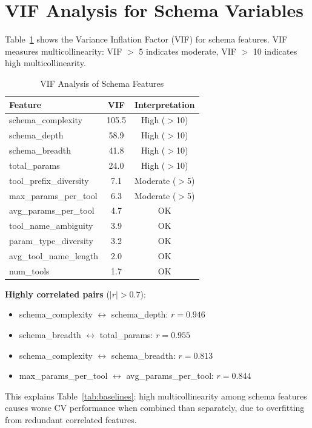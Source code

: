 \documentclass[sigconf,anonymous,review]{acmart}
\begin{document}
\section{VIF Analysis for Schema Variables}
\label{app:vif}

Table~\ref{tab:vif} shows the Variance Inflation Factor (VIF) for schema features. VIF measures multicollinearity: VIF $>$ 5 indicates moderate, VIF $>$ 10 indicates high multicollinearity.

\begin{table}[h]
\centering
\caption{VIF Analysis of Schema Features}
\label{tab:vif}
\small
\begin{tabular}{@{}lcc@{}}
\toprule
\textbf{Feature} & \textbf{VIF} & \textbf{Interpretation} \\
\midrule
schema\_complexity & 105.5 & High ($>$10) \\
schema\_depth & 58.9 & High ($>$10) \\
schema\_breadth & 41.8 & High ($>$10) \\
total\_params & 24.0 & High ($>$10) \\
tool\_prefix\_diversity & 7.1 & Moderate ($>$5) \\
max\_params\_per\_tool & 6.3 & Moderate ($>$5) \\
avg\_params\_per\_tool & 4.7 & OK \\
tool\_name\_ambiguity & 3.9 & OK \\
param\_type\_diversity & 3.2 & OK \\
avg\_tool\_name\_length & 2.0 & OK \\
num\_tools & 1.7 & OK \\
\bottomrule
\end{tabular}
\end{table}

\textbf{Highly correlated pairs} ($|r| > 0.7$):
\begin{itemize}[noitemsep]
    \item schema\_complexity $\leftrightarrow$ schema\_depth: $r = 0.946$
    \item schema\_breadth $\leftrightarrow$ total\_params: $r = 0.955$
    \item schema\_complexity $\leftrightarrow$ schema\_breadth: $r = 0.813$
    \item max\_params\_per\_tool $\leftrightarrow$ avg\_params\_per\_tool: $r = 0.844$
\end{itemize}

This explains Table~\ref{tab:baselines}: high multicollinearity among schema features causes worse CV performance when combined than separately, due to overfitting from redundant correlated features.
\end{document}
